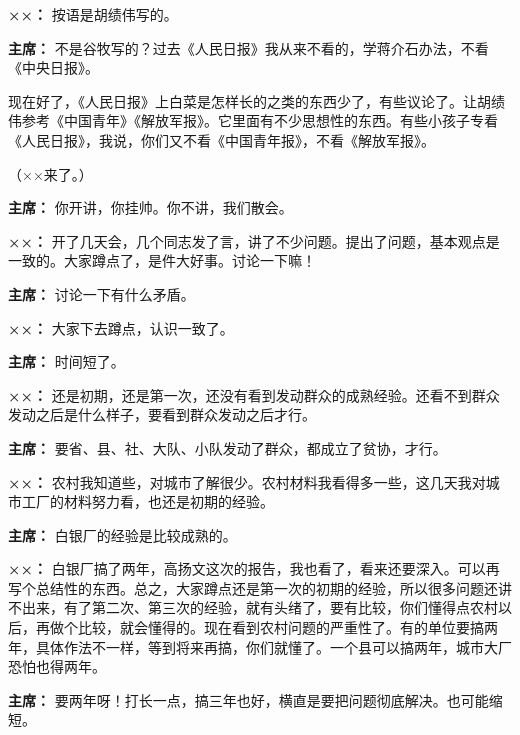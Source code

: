 \begin{duihua}
\item[\textbf{××：}] 按语是胡绩伟写的。

\item[\textbf{主席：}] 不是谷牧写的？过去《人民日报》我从来不看的，学蒋介石办法，不看《中央日报》。

现在好了，《人民日报》上白菜是怎样长的之类的东西少了，有些议论了。让胡绩伟参考《中国青年》《解放军报》。它里面有不少思想性的东西。有些小孩子专看《人民日报》，我说，你们又不看《中国青年报》，不看《解放军报》。

（××来了。）

\item[\textbf{主席：}] 你开讲，你挂帅。你不讲，我们散会。

\item[\textbf{××：}] 开了几天会，几个同志发了言，讲了不少问题。提出了问题，基本观点是一致的。大家蹲点了，是件大好事。讨论一下嘛！

\item[\textbf{主席：}] 讨论一下有什么矛盾。

\item[\textbf{××：}] 大家下去蹲点，认识一致了。

\item[\textbf{主席：}] 时间短了。

\item[\textbf{××：}] 还是初期，还是第一次，还没有看到发动群众的成熟经验。还看不到群众发动之后是什么样子，要看到群众发动之后才行。

\item[\textbf{主席：}] 要省、县、社、大队、小队发动了群众，都成立了贫协，才行。

\item[\textbf{××：}] 农村我知道些，对城市了解很少。农村材料我看得多一些，这几天我对城市工厂的材料努力看，也还是初期的经验。

\item[\textbf{主席：}] 白银厂的经验是比较成熟的。

\item[\textbf{××：}] 白银厂搞了两年，高扬文这次的报告，我也看了，看来还要深入。可以再写个总结性的东西。总之，大家蹲点还是第一次的初期的经验，所以很多问题还讲不出来，有了第二次、第三次的经验，就有头绪了，要有比较，你们懂得点农村以后，再做个比较，就会懂得的。现在看到农村问题的严重性了。有的单位要搞两年，具体作法不一样，等到将来再搞，你们就懂了。一个县可以搞两年，城市大厂恐怕也得两年。

\item[\textbf{主席：}] 要两年呀！打长一点，搞三年也好，横直是要把问题彻底解决。也可能缩短。


\end{duihua}
